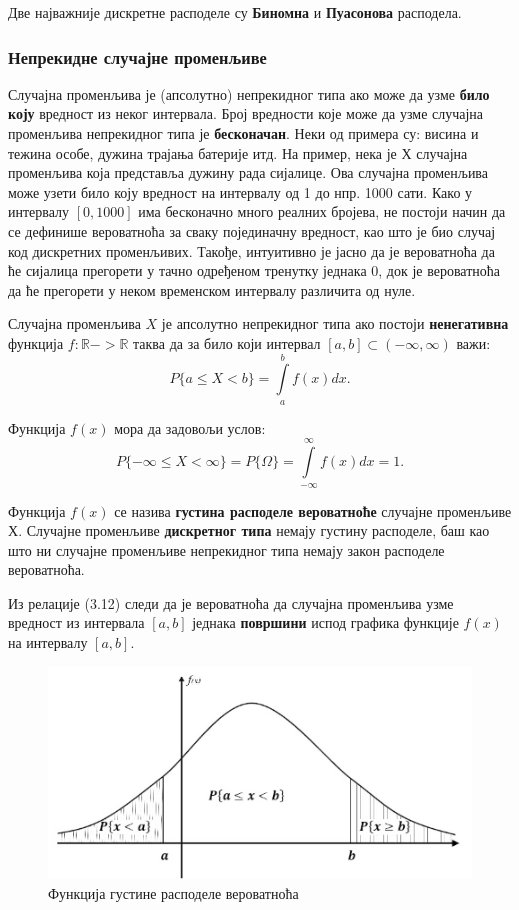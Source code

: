 Две најважније дискретне расподеле су \textbf{Биномна} и \textbf{Пуасонова} расподела.

\subsubsection{Непрекидне случајне променљиве}
Случајна променљива је (апсолутно) непрекидног типа ако може да узме \textbf{било коју} вредност из неког интервала. Број вредности које може да узме случајна променљива непрекидног типа је \textbf{бесконачан}. Неки од примера су: висина и тежина особе, дужина трајања батерије итд.
На пример, нека је $Х$ случајна променљива која представља дужину рада сијалице. Ова случајна променљива може узети било коју вредност на интервалу од 1 до нпр. 1000 сати. Како у интервалу $[0,1000]$ има бесконачно много реалних бројева, не постоји начин да се дефинише вероватноћа за сваку појединачну вредност, као што је био случај код дискретних променљивих. Такође, интуитивно је јасно да је вероватноћа да ће сијалица прегорети у тачно одређеном тренутку једнака 0, док је вероватноћа да ће прегорети у неком временском интервалу различита од нуле.


\begin{de}
Случајна променљива $X$ је апсолутно непрекидног типа ако постоји \textbf{ненегативна} функција $f: \mathbb{R} -> \mathbb{R}$ таква да за било који интервал $[a,b] \subset (- \infty,\infty)$ важи:
\begin{equation}
P \lbrace a \leq X < b \rbrace = \int\limits_{a}^{b} f(x)dx.
\end{equation}
\end{de}

Функција $f(x)$ мора да задовољи услов: 
$$
P \lbrace - \infty \leq X <  \infty \rbrace = P \lbrace \Omega \rbrace =  \int\limits_{- \infty}^{\infty} f(x)dx  = 1.
$$

Функција $f(x)$ се назива \textbf{густина расподеле вероватноће} случајне променљиве $Х$.
Случајне променљиве \textbf{дискретног типа} немају густину расподеле, баш као што ни случајне променљиве непрекидног типа немају закон расподеле вероватноћа.

Из релације (3.12) следи да је вероватноћа да случајна променљива узме вредност из интервала  $[a,b]$ једнака \textbf{површини} испод графика функције $f(x)$ на интервалу $[a,b]$.


\begin{figure}[H]
    \centering
\captionsetup{justification=centering}
   \includegraphics[scale=0.8]{./Slike/slika15.png} 
	\caption{Функција густине расподеле вероватноћа} 
	\label{fig:slika13}
\end{figure}


